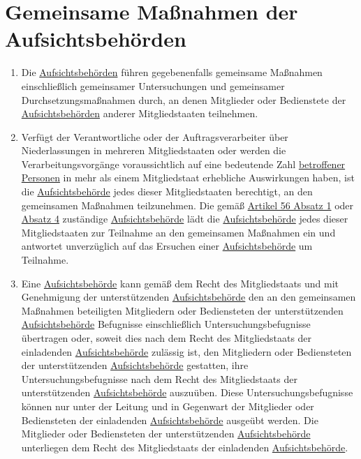 \chapter{Gemeinsame Maßnahmen der Aufsichtsbehörden}
\label{ch:62}


\begin{enumerate}

  \item Die \hyperref[itm:04-21]{Aufsichtsbehörden} führen gegebenenfalls gemeinsame Maßnahmen einschließlich gemeinsamer Untersuchungen und
   gemeinsamer Durchsetzungsmaßnahmen durch, an denen Mitglieder oder Bedienstete der \hyperref[itm:04-21]{Aufsichtsbehörden} anderer
   Mitgliedstaaten teilnehmen.
  \label{itm:62-1}

  \item Verfügt der Verantwortliche oder der Auftragsverarbeiter über Niederlassungen in mehreren Mitgliedstaaten oder
   werden die Verarbeitungsvorgänge voraussichtlich auf eine bedeutende Zahl \hyperref[itm:04-1]{betroffener Personen} in mehr als einem
   Mitgliedstaat erhebliche Auswirkungen haben, ist die \hyperref[itm:04-21]{Aufsichtsbehörde} jedes dieser Mitgliedstaaten berechtigt, an
   den gemeinsamen Maßnahmen teilzunehmen. Die gemäß \hyperref[itm:56-1]{Artikel 56 Absatz 1} oder \hyperref[itm:56-4]
   {Absatz 4} zuständige \hyperref[itm:04-21]{Aufsichtsbehörde} lädt die \hyperref[itm:04-21]{Aufsichtsbehörde} jedes dieser Mitgliedstaaten zur Teilnahme an den
   gemeinsamen Maßnahmen ein und antwortet unverzüglich auf das Ersuchen einer \hyperref[itm:04-21]{Aufsichtsbehörde} um Teilnahme.
  \label{itm:62-2}

  \item Eine \hyperref[itm:04-21]{Aufsichtsbehörde} kann gemäß dem Recht des Mitgliedstaats und mit Genehmigung der unterstützenden
   \hyperref[itm:04-21]{Aufsichtsbehörde} den an den gemeinsamen Maßnahmen beteiligten Mitgliedern oder Bediensteten der unterstützenden
   \hyperref[itm:04-21]{Aufsichtsbehörde} Befugnisse einschließlich Untersuchungsbefugnisse übertragen oder, soweit dies nach dem Recht des
   Mitgliedstaats der einladenden \hyperref[itm:04-21]{Aufsichtsbehörde} zulässig ist, den Mitgliedern oder Bediensteten der unterstützenden
   \hyperref[itm:04-21]{Aufsichtsbehörde} gestatten, ihre Untersuchungsbefugnisse nach dem Recht des Mitgliedstaats der unterstützenden
   \hyperref[itm:04-21]{Aufsichtsbehörde} auszuüben. Diese Untersuchungsbefugnisse können nur unter der Leitung und in Gegenwart der
   Mitglieder oder Bediensteten der einladenden \hyperref[itm:04-21]{Aufsichtsbehörde} ausgeübt werden. Die Mitglieder oder Bediensteten der
   unterstützenden \hyperref[itm:04-21]{Aufsichtsbehörde} unterliegen dem Recht des Mitgliedstaats der einladenden \hyperref[itm:04-21]{Aufsichtsbehörde}.
  \label{itm:62-3}


\end{enumerate}
